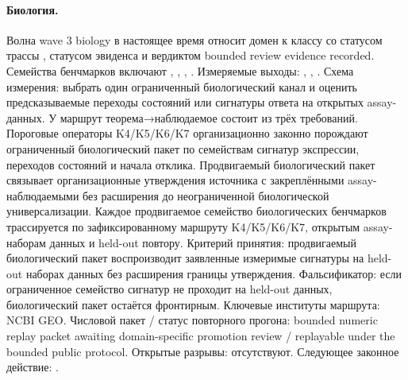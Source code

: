 \paragraph{Биология.}
Волна wave 3 biology в настоящее время относит домен к классу  со статусом трассы , статусом эвиденса  и вердиктом bounded review evidence recorded.
Семейства бенчмарков включают , \allowbreak {}, \allowbreak {}, \allowbreak {}.
Измеряемые выходы: , \allowbreak {}, \allowbreak {}.
Схема измерения: выбрать один ограниченный биологический канал и оценить предсказываемые переходы состояний или сигнатуры ответа на открытых assay-данных.
У маршрут теорема→наблюдаемое состоит из трёх требований. Пороговые операторы K4/K5/K6/K7 организационно законно порождают ограниченный биологический пакет по семействам сигнатур экспрессии, переходов состояний и начала отклика. Продвигаемый биологический пакет связывает организационные утверждения источника с закреплёнными assay-наблюдаемыми без расширения до неограниченной биологической универсализации. Каждое продвигаемое семейство биологических бенчмарков трассируется по зафиксированному маршруту K4/K5/K6/K7, открытым assay-наборам данных и held-out повтору.
Критерий принятия: продвигаемый биологический пакет воспроизводит заявленные измеримые сигнатуры на held-out наборах данных без расширения границы утверждения.
Фальсификатор: если ограниченное семейство сигнатур не проходит на held-out данных, биологический пакет остаётся фронтирным.
Ключевые институты маршрута: NCBI GEO.
Числовой пакет / статус повторного прогона: bounded numeric replay packet awaiting domain-specific promotion review / replayable under the bounded public protocol.
Открытые разрывы: отсутствуют.
Следующее законное действие: .

